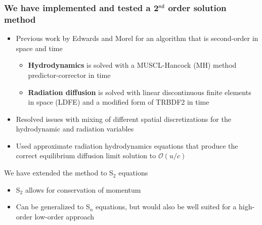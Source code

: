 \documentclass[xcolor=dvipsnames,fontsize=8pt]{beamer}
\newcommand{\colb}[1]{{\color{blue} #1}}
\newlength{\wideitemsep}
\let\olditem\item
\renewcommand{\item}{\setlength{\itemsep}{\wideitemsep}\olditem}
\begin{document}
\begin{frame}
    \frametitle{We have implemented and tested a 2$^{\textsf{nd}}$ order solution method}
        \begin{itemize}
            \item Previous work by Edwards and Morel for an algorithm that is second-order in
     \colb{space} and \colb{time}
            \begin{itemize}
                \item \textbf{Hydrodynamics} is solved with a MUSCL-Hancock (MH) method predictor-corrector
                in time
            \item \textbf{Radiation diffusion} is solved with linear discontinuous finite
                elements in space (LDFE) and a modified form of TRBDF2 in time
             \end{itemize}
            \item Resolved issues with mixing of different spatial discretizations
                for the hydrodynamic and radiation variables
            \item Used approximate radiation hydrodynamics equations that produce the correct
        equilibrium diffusion limit solution to $\mathcal{O}(u/c)$
        \end{itemize}
        \begin{block}{We have extended the method to S$_2$ equations }
     \begin{itemize}
        \item S$_2$ allows for conservation of momentum
        \item Can be generalized to S$_n$ equations, but would also be well suited
            for a high-order low-order approach 
     \end{itemize}
     \end{block}
\end{frame}
\end{document}
